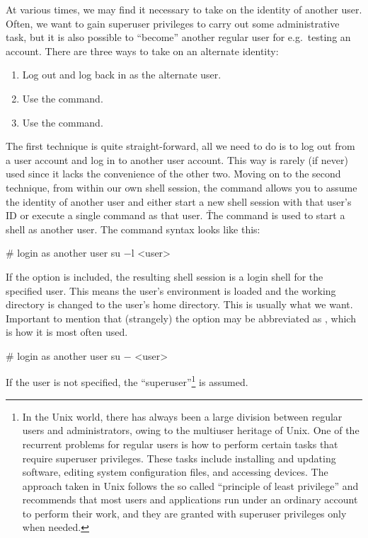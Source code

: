At various times, we may find it necessary to take on the identity of another user. Often, we want to gain superuser
privileges to carry out some administrative task, but it is also possible to ``become'' another regular user for e.g.\
testing an account. There are three ways to take on an alternate identity:
\begin{enumerate}
\item Log out and log back in as the alternate user.
\item Use the  command.
\item Use the  command.
\end{enumerate}

The first technique is quite straight-forward, all we need to do is to log out from a user account and log in to another
user account. This way is rarely (if never) used since it lacks the convenience of the other two. \v

Moving on to the second technique, from within our own shell session, the  command allows you to assume the
identity of another user and either start a new shell session with that user's ID or execute a single command as that
user. \v

The  command is used to start a shell as another user. The command syntax looks like this:
\begin{bash}
# login as another user
su $-$l <user>
\end{bash}

If the  option is included, the resulting shell session is a login shell for the specified user. This means
the user's environment is loaded and the working directory is changed to the user's home directory. This is usually
what we want. Important to mention that (strangely) the \code{-l} option may be abbreviated as \code{-}, which is how
it is most often used.

\begin{bash}
# login as another user
su $-$ <user>
\end{bash}

If the user is not specified, the ``superuser''\footnote{In the Unix world, there has always been a large division
between regular users and administrators, owing to the multiuser heritage of Unix. One of the recurrent problems for
regular users is how to perform certain tasks that require superuser privileges. These tasks include installing and
updating software, editing system configuration files, and accessing devices. The approach taken in Unix follows the so
called ``principle of least privilege'' and recommends that most users and applications run under an ordinary account
to perform their work, and they are granted with superuser privileges only when needed.} is assumed.

